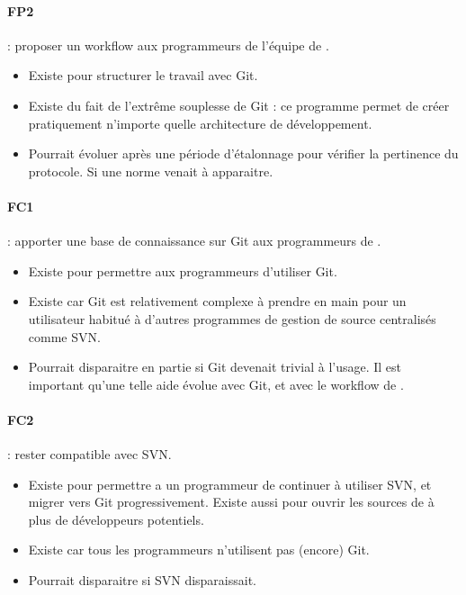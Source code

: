 \paragraph*{FP2} : proposer un workflow aux programmeurs de l'équipe de {\gofigure}.
\begin{itemize}
  \item Existe pour structurer le travail avec Git.
  \item Existe du fait de l'extrême souplesse de Git : ce programme 
  permet de créer pratiquement n'importe quelle architecture de développement.
  \item Pourrait évoluer après une période d'étalonnage pour vérifier la pertinence du protocole.
  Si une norme venait à apparaitre.
\end{itemize}

\paragraph*{FC1} : apporter une base de connaissance sur Git aux programmeurs de \gofigure.
\begin{itemize}
  \item Existe pour permettre aux programmeurs d'utiliser Git.
  \item Existe car Git est relativement complexe à prendre en main 
  pour un utilisateur habitué à d'autres programmes de gestion de source centralisés comme SVN.
  \item Pourrait disparaitre en partie si Git devenait trivial à l'usage.
  Il est important qu'une telle aide évolue avec Git, et avec le workflow de {\gofigure}.
\end{itemize}

\paragraph*{FC2} : rester compatible avec SVN.
\begin{itemize}
  \item Existe pour permettre a un programmeur de continuer à utiliser SVN, et migrer vers Git progressivement.
  Existe aussi pour ouvrir les sources de {\gofigure} à plus de développeurs potentiels.
  \item Existe car tous les programmeurs n'utilisent pas (encore) Git.
  \item Pourrait disparaitre si SVN disparaissait.
\end{itemize}

